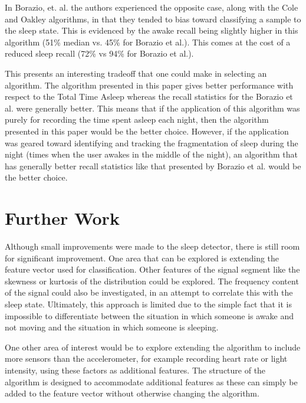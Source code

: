             In Borazio, et. al. the authors experienced the opposite case, along with the Cole \cite{cole} and Oakley \cite{oakley} algorithms, in that they tended to bias toward classifying a sample to the sleep state. This is evidenced by the awake recall being slightly higher in this algorithm (51\% median vs. 45\% for Borazio et al.). This comes at the cost of a reduced sleep recall (72\% vs 94\% for Borazio et al.).

            This presents an interesting tradeoff that one could make in selecting an algorithm. The algorithm presented in this paper gives better performance with respect to the Total Time Asleep whereas the recall statistics for the Borazio et al. were generally better. This means that if the application of this algorithm was purely for recording the time spent asleep each night, then the algorithm presented in this paper would be the better choice. However, if the application was geared toward identifying and tracking the fragmentation of sleep during the night (times when the user awakes in the middle of the night), an algorithm that has generally better recall statistics like that presented by Borazio et al. would be the better choice. 


    \chapter{Further Work}

        Although small improvements were made to the sleep detector, there is still room for significant improvement. One area that can be explored is extending the feature vector used for classification. Other features of the signal segment like the skewness or kurtosis of the distribution could be explored. The frequency content of the signal could also be investigated, in an attempt to correlate this with the sleep state. Ultimately, this approach is limited due to the simple fact that it is impossible to differentiate between the situation in which someone is awake and not moving and the situation in which someone is sleeping. 

        One other area of interest would be to explore extending the algorithm to include more sensors than the accelerometer, for example recording heart rate or light intensity, using these factors as additional features. The structure of the algorithm is designed to accommodate additional features as these can simply be added to the feature vector without otherwise changing the algorithm.